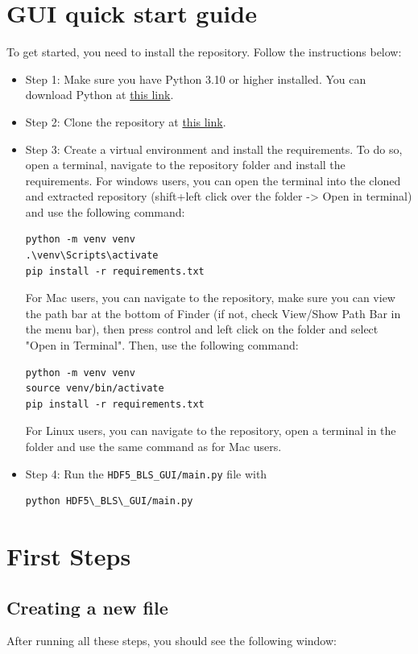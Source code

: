\documentclass{book}
\begin{document}
    \section{GUI quick start guide}
        To get started, you need to install the repository. Follow the instructions below:

        \begin{itemize}
            \item Step 1: Make sure you have Python 3.10 or higher installed. You can download Python at \href{https://www.python.org/downloads/}{this link}.
            \item Step 2: Clone the repository at \href{https://github.com/bio-brillouin/HDF5_BLS/tree/main}{this link}.    
            \item Step 3: Create a virtual environment and install the requirements. To do so, open a terminal, navigate to the repository folder and install the requirements. For windows users, you can open the terminal into the cloned and extracted repository (shift+left click over the folder -> Open in terminal) and use the following command:
\begin{lstlisting}
python -m venv venv
.\venv\Scripts\activate
pip install -r requirements.txt
\end{lstlisting}
            For Mac users, you can navigate to the repository, make sure you can view the path bar at the bottom of Finder (if not, check View/Show Path Bar in the menu bar), then press control and left click on the folder and select "Open in Terminal". Then, use the following command:
\begin{lstlisting}
python -m venv venv
source venv/bin/activate
pip install -r requirements.txt
\end{lstlisting}
            For Linux users, you can navigate to the repository, open a terminal in the folder and use the same command as for Mac users.
            \item Step 4: Run the \texttt{HDF5\_BLS\_GUI/main.py} file with
\begin{lstlisting}
python HDF5\_BLS\_GUI/main.py
\end{lstlisting}
        \end{itemize}

    \section{First Steps}
        \subsection{Creating a new file}
            After running all these steps, you should see the following window:
\end{document}
